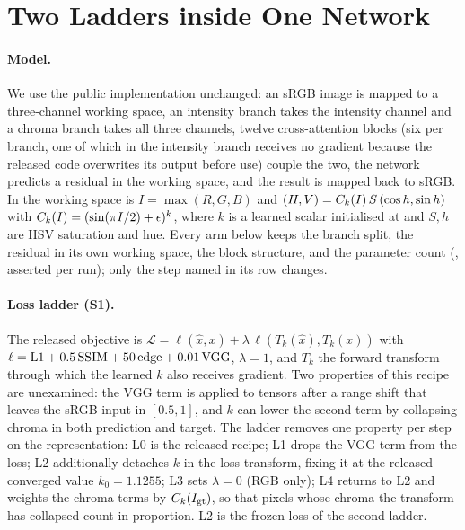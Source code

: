 \section{Two Ladders inside One Network}
\label{sec:method}

\paragraph{Model.} We use the public \mname implementation \citep{yan2025hvi} unchanged:
an sRGB image is mapped to a three-channel working space, an intensity branch takes the
intensity channel and a chroma branch takes all three channels, twelve cross-attention
blocks (six per branch, one of which in the intensity branch receives no gradient because
the released code overwrites its output before use) couple the two, the network predicts a residual in the working space, and the result is
mapped back to sRGB. In \hvi the working space is $I = \max(R,G,B)$ and
$(H, V) = C_k(I)\, S\, (\cos h, \sin h)$ with $C_k(I) = (\sin(\pi I/2) + \epsilon)^{k}$, where
$k$ is a learned scalar initialised at  and $S, h$ are HSV saturation and hue. Every arm
below keeps the branch split, the residual in its own working space, the block structure,
and the parameter count (, asserted per run); only the step named in its row
changes.

\paragraph{Loss ladder (S1).} The released objective is
$\mathcal{L} = \ell(\hat{x}, x) + \lambda\, \ell(T_k(\hat{x}), T_k(x))$ with
$\ell = \mathrm{L1} + 0.5\,\mathrm{SSIM} + 50\,\mathrm{edge} + 0.01\,\mathrm{VGG}$, $\lambda = 1$,
and $T_k$ the forward \hvi transform through which the learned $k$ also receives gradient.
Two properties of this recipe are unexamined: the VGG term is applied to \hvi tensors after a
range shift that leaves the sRGB input in $[0.5, 1]$, and $k$ can lower the second term by
collapsing chroma in both prediction and target. The ladder removes one property per step on
the \hvi representation: L0 is the released recipe; L1 drops the VGG term from the \hvi
loss; L2 additionally detaches $k$ in the loss transform, fixing it at the released converged
value $k_0 = 1.1255$; L3 sets $\lambda = 0$ (RGB only); L4 returns to L2 and weights the \hvi
chroma terms by $C_k(I_{\mathrm{gt}})$, so that pixels whose chroma the transform has
collapsed count in proportion. L2 is the frozen loss of the second ladder.

